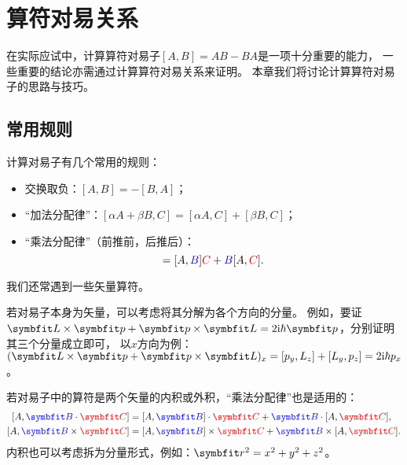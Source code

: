 
\section{算符对易关系}
\label{sec:commutator}

在实际应试中，计算算符对易子$[A,B]=AB-BA$是一项十分重要的能力，
一些重要的结论亦需通过计算算符对易关系来证明。
本章我们将讨论计算算符对易子的思路与技巧。

\subsection{常用规则}
\label{subsec:commutator_rules}

计算对易子有几个常用的规则：
\begin{itemize}
    \item 交换取负：$[A,B] = -[B,A]$；
    \item ``加法分配律''：$[\alpha A+\beta B,C] = [\alpha A,C]+[\beta B,C]$；
    \item ``乘法分配律''（前推前，后推后）：
    \begin{equation}
        [A, \blue{B}\red{C}] = [A,\blue{B}] \red{C} + \blue{B}[A,\red{C}].
    \end{equation}
\end{itemize}

我们还常遇到一些矢量算符。

若对易子本身为矢量，可以考虑将其分解为各个方向的分量。
例如，要证$\LL\times\pp+\pp\times\LL = 2\ii\hbar\pp$，分别证明其三个分量成立即可，
以$x$方向为例：$(\LL\times\pp+\pp\times\LL)_x = [p_y,L_z]+[L_y,p_z] = 2\ii\hbar p_x$。

若对易子中的算符是两个矢量的内积或外积，``乘法分配律''也是适用的：
\begin{equation}
    \begin{aligned}
        \relax
        [A, \blue{\bm{B}}\cdot\red{\bm{C}}] &= [A,\blue{\bm{B}}]\cdot\red{\bm{C}} + \blue{\bm{B}}\cdot[A,\red{\bm{C}}], \\
        [A, \blue{\bm{B}}\times\red{\bm{C}}] &= [A,\blue{\bm{B}}]\times\red{\bm{C}} + \blue{\bm{B}}\times[A,\red{\bm{C}}].
\end{aligned}
\end{equation}
内积也可以考虑拆为分量形式，例如：$\rr^2=x^2+y^2+z^2$。

